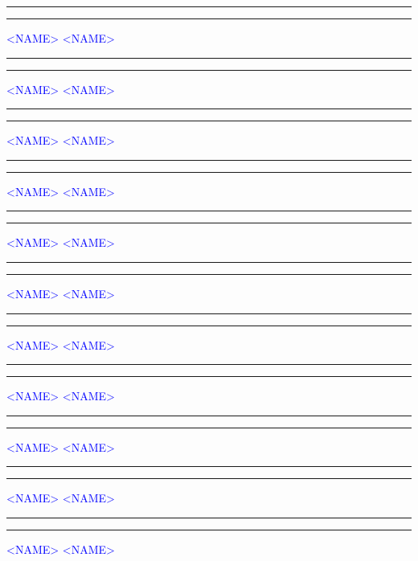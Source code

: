 \documentclass[fontsize=12pt,parskip=half]{scrartcl}
\begin{document}
\vspace{50pt}
\noindent\rule{7cm}{.4pt}\hfill\rule{7cm}{.4pt}\par
\noindent \textcolor{blue}{<NAME>} \hfill\textcolor{blue}{<NAME>}

\vspace{50pt}
\noindent\rule{7cm}{.4pt}\hfill\rule{7cm}{.4pt}\par
\noindent \textcolor{blue}{<NAME>} \hfill\textcolor{blue}{<NAME>}

\vspace{50pt}
\noindent\rule{7cm}{.4pt}\hfill\rule{7cm}{.4pt}\par
\noindent \textcolor{blue}{<NAME>} \hfill\textcolor{blue}{<NAME>}

\vspace{50pt}
\noindent\rule{7cm}{.4pt}\hfill\rule{7cm}{.4pt}\par
\noindent \textcolor{blue}{<NAME>} \hfill\textcolor{blue}{<NAME>}

\vspace{50pt}
\noindent\rule{7cm}{.4pt}\hfill\rule{7cm}{.4pt}\par
\noindent \textcolor{blue}{<NAME>} \hfill\textcolor{blue}{<NAME>}

\vspace{50pt}
\noindent\rule{7cm}{.4pt}\hfill\rule{7cm}{.4pt}\par
\noindent \textcolor{blue}{<NAME>} \hfill\textcolor{blue}{<NAME>}

\vspace{50pt}
\noindent\rule{7cm}{.4pt}\hfill\rule{7cm}{.4pt}\par
\noindent \textcolor{blue}{<NAME>} \hfill\textcolor{blue}{<NAME>}

\vspace{50pt}
\noindent\rule{7cm}{.4pt}\hfill\rule{7cm}{.4pt}\par
\noindent \textcolor{blue}{<NAME>} \hfill\textcolor{blue}{<NAME>}

\vspace{50pt}
\noindent\rule{7cm}{.4pt}\hfill\rule{7cm}{.4pt}\par
\noindent \textcolor{blue}{<NAME>} \hfill\textcolor{blue}{<NAME>}

\vspace{50pt}
\noindent\rule{7cm}{.4pt}\hfill\rule{7cm}{.4pt}\par
\noindent \textcolor{blue}{<NAME>} \hfill\textcolor{blue}{<NAME>}

\vspace{50pt}
\noindent\rule{7cm}{.4pt}\hfill\rule{7cm}{.4pt}\par
\noindent \textcolor{blue}{<NAME>} \hfill\textcolor{blue}{<NAME>}
\end{document}
